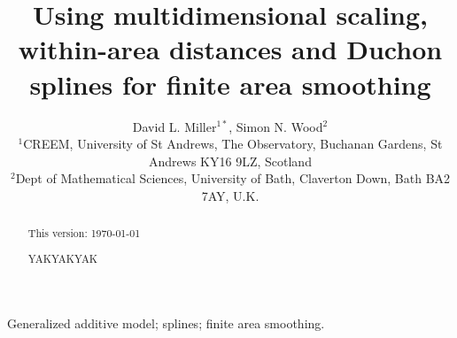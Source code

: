 \documentclass[useAMS,referee, usegraphicx]{biom}
\title[Finite area smoothing with MDS]{Using multidimensional scaling, within-area distances and Duchon splines for finite area smoothing}
\author{David L. Miller$^{1*}$\email{dave@ninepointeightone.net}, Simon N. Wood$^{2}$\\
$^{1}$CREEM, University of St Andrews, The Observatory, Buchanan Gardens, St Andrews KY16 9LZ, Scotland\\
$^{2}$Dept of Mathematical Sciences, University of Bath, Claverton Down, Bath BA2 7AY, U.K.
}
\begin{document}








\label{firstpage}


\begin{abstract}
This version: \today %

YAKYAKYAK
\end{abstract}

%

\begin{keywords}
Generalized additive model; splines; finite area smoothing.
\end{keywords}
\end{document}
